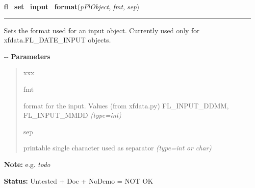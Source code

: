 \hspace{.8\funcindent}\begin{boxedminipage}{\funcwidth}

    \raggedright \textbf{fl\_set\_input\_format}(\textit{pFlObject}, \textit{fmt}, \textit{sep})

    \vspace{-1.5ex}

    \rule{\textwidth}{0.5\fboxrule}
\setlength{\parskip}{2ex}

Sets the format used for an input object. Currently used only for
xfdata.FL\_DATE\_INPUT objects.

-{}-
\setlength{\parskip}{1ex}
      \textbf{Parameters}
      \vspace{-1ex}

      \begin{quote}
        \begin{Ventry}{xxx}

          \item[fmt]


format for the input. Values (from xfdata.py) FL\_INPUT\_DDMM,
FL\_INPUT\_MMDD
            {\it (type=int)}

          \item[sep]


printable single character used as separator
            {\it (type=int or char)}

        \end{Ventry}

      \end{quote}

\textbf{Note:} 
e.g. \emph{todo}


\textbf{Status:} 
Untested + Doc + NoDemo = NOT OK


    \end{boxedminipage}

    \label{xformslib:flinput:fl_set_input_hscrollbar}

    \vspace{0.5ex}

